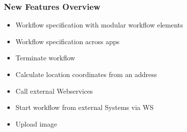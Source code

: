
\begin{frame}
\frametitle{New Features Overview}

\begin{itemize}
\item  Workflow specification with modular workflow elements
\item Workflow specification across apps
\item Terminate workflow
\item Calculate location coordinates from an address
\item Call external Webservices
\item Start workflow from external Systems via WS
\item Upload image
\end{itemize}
\end{frame}


